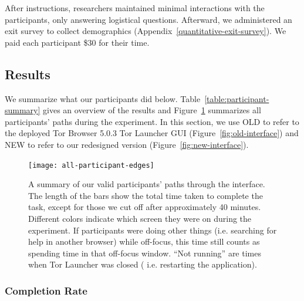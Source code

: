 \documentclass[USenglish,oneside,twocolumn]{article}
\begin{document}
After instructions, researchers maintained minimal interactions with the participants, only answering logistical questions. Afterward, we administered an exit survey to collect demographics (Appendix~\ref{quantitative-exit-survey}). We paid each participant \$30 for their time. 

\subsection{Results} 
We summarize what our participants did below.  Table~\ref{table:participant-summary} gives an overview of the results and Figure~\ref{fig:all-participant-edges} summarizes all participants' paths during the experiment. In this section, we use OLD to refer to the deployed Tor Browser 5.0.3 Tor Launcher GUI (Figure~\ref{fig:old-interface}) and NEW to refer to our redesigned version (Figure~\ref{fig:new-interface}).

\label{all-participant-edges} 
\begin{figure}
\centering
\texttt{[image: all-participant-edges]}
\caption{
A summary of our valid participants' paths through the interface.
The length of the bars show the total time taken to complete the task,
except for those we cut off after approximately 40 minutes.
Different colors indicate which screen they were on during the experiment.
If participants were doing other things (i.e. searching for help in another browser)
while off-focus, this time still counts as spending time in that off-focus window. 
``Not running'' are times when Tor Launcher was closed (
i.e. restarting the application).}
\label{fig:all-participant-edges}
\end{figure}

\subsubsection{Completion Rate} 
\end{document}
